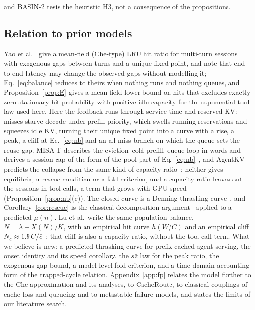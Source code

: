 and BASIN-2 tests the heuristic H3, not a consequence of the propositions.

\subsection{Relation to prior models}\label{sec:fp-prior}
Yao et al.~\citep{yao2026multiturn} give a mean-field (Che-type) LRU hit ratio for multi-turn sessions with exogenous gaps between turns and a unique fixed point, and note that end-to-end latency may change the observed gaps without modelling it; Eq.~\eqref{eq:balance} reduces to theirs when nothing runs and nothing queues, and Proposition~\ref{prop:E} gives a mean-field lower bound on hits that excludes exactly zero stationary hit probability with positive idle capacity for the exponential tool law used here. Here the feedback runs through service time and reserved KV: misses starve decode under prefill priority, which swells running reservations and squeezes idle KV, turning their unique fixed point into a curve with a rise, a peak, a cliff at Eq.~\eqref{eq:nb} and an all-miss branch on which the queue sets the reuse gap. MISA-T describes the eviction--cold-prefill--queue loop in words and derives a session cap of the form of the pool part of Eq.~\eqref{eq:nb}~\citep{hong2026misat}, and AgentKV predicts the collapse from the same kind of capacity ratio~\citep{anon2026agentkv}; neither gives equilibria, a rescue condition or a fold criterion, and a capacity ratio leaves out the sessions in tool calls, a term that grows with GPU speed (Proposition~\ref{prop:nb}(c)). The closed curve is a Denning thrashing curve~\citep{denning1968thrashing}, and Corollary~\ref{cor:rescue} is the classical decomposition argument~\citep{courtois1975decomposability} applied to a predicted $\mu(n)$. Lu et al.\ write the same population balance, $\dot N=\lambda-X(N)/K$, with an empirical hit curve $h(W/C)$ and an empirical cliff $N_c\approx1.9\,C/\bar c$~\citep{lu2026cachetrap}; that cliff is also a capacity ratio, without the tool-call term. What we believe is new: a predicted thrashing curve for prefix-cached agent serving, the onset identity and its speed corollary, the $s\bar z$ law for the peak ratio, the exogenous-gap bound, a model-level fold criterion, and a time-domain accounting form of the trapped-cycle relation. Appendix~\ref{app:fp} relates the model further to the Che approximation and its analyses, to CacheRoute, to classical couplings of cache loss and queueing and to metastable-failure models, and states the limits of our literature search.
